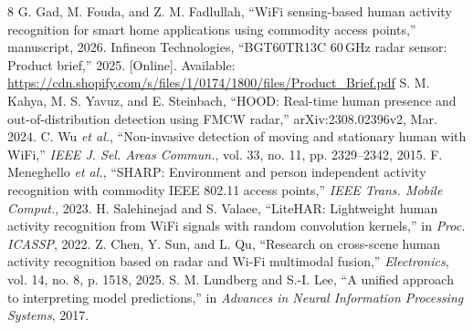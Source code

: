 \documentclass[conference,10pt,letterpaper]{IEEEtran}
\begin{document}
\begin{thebibliography}{8}
 G. Gad, M. Fouda, and Z. M. Fadlullah, ``WiFi sensing-based human activity recognition for smart home applications using commodity access points,'' manuscript, 2026.
 Infineon Technologies, ``BGT60TR13C 60\,GHz radar sensor: Product brief,'' 2025. [Online]. Available: \url{https://cdn.shopify.com/s/files/1/0174/1800/files/Product_Brief.pdf}
 S. M. Kahya, M. S. Yavuz, and E. Steinbach, ``HOOD: Real-time human presence and out-of-distribution detection using FMCW radar,'' arXiv:2308.02396v2, Mar. 2024.
 C. Wu \emph{et al.}, ``Non-invasive detection of moving and stationary human with WiFi,'' \emph{IEEE J. Sel. Areas Commun.}, vol. 33, no. 11, pp. 2329--2342, 2015.
 F. Meneghello \emph{et al.}, ``SHARP: Environment and person independent activity recognition with commodity IEEE 802.11 access points,'' \emph{IEEE Trans. Mobile Comput.}, 2023.
 H. Salehinejad and S. Valaee, ``LiteHAR: Lightweight human activity recognition from WiFi signals with random convolution kernels,'' in \emph{Proc. ICASSP}, 2022.
 Z. Chen, Y. Sun, and L. Qu, ``Research on cross-scene human activity recognition based on radar and Wi-Fi multimodal fusion,'' \emph{Electronics}, vol. 14, no. 8, p. 1518, 2025.
 S. M. Lundberg and S.-I. Lee, ``A unified approach to interpreting model predictions,'' in \emph{Advances in Neural Information Processing Systems}, 2017.
\end{thebibliography}
\end{document}
